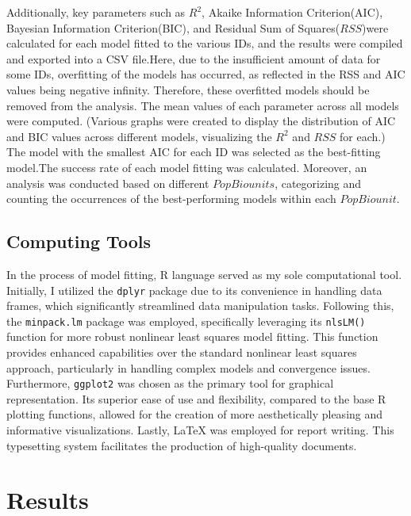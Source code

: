 \documentclass[11pt]{article}
\begin{document}
Additionally, key parameters such as $R^2$, Akaike Information Criterion(AIC), Bayesian Information Criterion(BIC), and Residual Sum of Squares($RSS$)were calculated for each model fitted to the various IDs, and the results were compiled and exported into a CSV file.Here, due to the insufficient amount of data for some IDs, overfitting of the models has occurred, as reflected in the RSS and AIC values being negative infinity. Therefore, these overfitted models should be removed from the analysis. The mean values of each parameter across all models were computed. (Various graphs were created to display the distribution of AIC and BIC values across different models, visualizing the \( R^2 \) and $RSS$ for each.) The model with the smallest AIC for each ID was selected as the best-fitting model.The success rate of each model fitting was calculated. Moreover, an analysis was conducted based on different $PopBiounits$, categorizing and counting the occurrences of the best-performing models within each $PopBiounit$.
\subsection{Computing Tools}

In the process of model fitting, R language served as my sole computational tool. Initially, I utilized the \texttt{dplyr} package due to its convenience in handling data frames, which significantly streamlined data manipulation tasks. Following this, the \texttt{minpack.lm} package was employed, specifically leveraging its \texttt{nlsLM()} function for more robust nonlinear least squares model fitting. This function provides enhanced capabilities over the standard nonlinear least squares approach, particularly in handling complex models and convergence issues. Furthermore, \texttt{ggplot2} was chosen as the primary tool for graphical representation. Its superior ease of use and flexibility, compared to the base R plotting functions, allowed for the creation of more aesthetically pleasing and informative visualizations. Lastly, LaTeX was employed for report writing. This typesetting system facilitates the production of high-quality documents. 


\section{Results}
\end{document}
